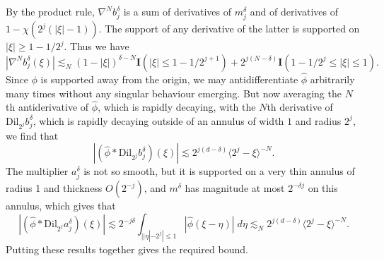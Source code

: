 %
By the product rule, $\nabla^N b^\delta_j$ is a sum of derivatives of $m^\delta_j$ and of derivatives of $1 - \chi(2^j (|\xi| - 1))$. The support of any derivative of the latter is supported on $|\xi| \geq 1 - 1/2^j$. Thus we have
%
\[ |\nabla^N b^\delta_j(\xi)| \lesssim_N (1 - |\xi|)^{\delta - N} \mathbf{I}(|\xi| \leq 1 - 1/2^{j+1}) + 2^{j(N - \delta)} \mathbf{I}(1 - 1/2^j \leq |\xi| \leq 1). \]
%
Since $\phi$ is supported away from the origin, we may antidifferentiate $\widehat{\phi}$ arbitrarily many times without any singular behaviour emerging. But now averaging the $N$th antiderivative of $\widehat{\phi}$, which is rapidly decaying, with the $N$th derivative of $\text{Dil}_{2^j} b^\delta_j$, which is rapidly decaying outside of an annulus of width $1$ and radius $2^j$, we find that
%
\[ |(\widehat{\phi} * \text{Dil}_{2^j} b^\delta_j)(\xi)| \lesssim 2^{j(d - \delta)} \langle 2^j - \xi \rangle^{-N}. \]
%
The multiplier $a^\delta_j$ is not so smooth, but it is supported on a very thin annulus of radius 1 and thickness $O(2^{-j})$, and $m^\delta$ has magnitude at most $2^{- \delta j}$ on this annulus, which gives that
%
\[ |(\widehat{\phi} * \text{Dil}_{2^j} a^\delta_j)(\xi)| \lesssim 2^{-j\delta} \int_{||\eta| - 2^j| \leq 1} |\widehat{\phi}(\xi - \eta)|\; d\eta \lesssim_N 2^{j(d - \delta)} \langle 2^j - \xi \rangle^{-N}. \]
%
Putting these results together gives the required bound.

%

%

